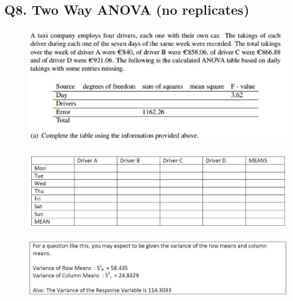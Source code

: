 \documentclass[a4paper,12pt]{article}
\begin{document}
\subsection*{Q8. Two Way ANOVA (no replicates)}
\begin{figure}[h!]
	\centering
	\includegraphics[width=0.9\linewidth]{image/Q26Review1}
	
\end{figure}
\begin{figure}[h!]
	\centering
	\includegraphics[width=0.9\linewidth]{image/Q26review2}
	
\end{figure}
\begin{figure}[h!]
	\centering
	\includegraphics[width=0.9\linewidth]{image/Q26review3}
	
\end{figure}
\newpage
\end{document}
